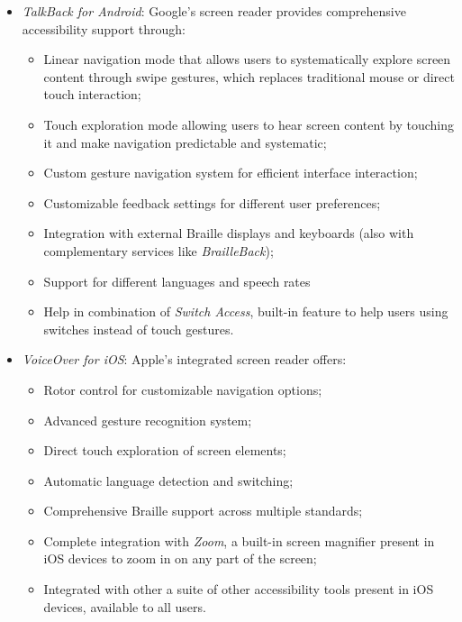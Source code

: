 \begin{itemize}
    \item \textit{TalkBack for Android}: Google's screen reader provides comprehensive accessibility support through:
        \begin{itemize}
            \item Linear navigation mode that allows users to systematically explore screen content through swipe gestures, which replaces traditional mouse or direct touch interaction;
            \item Touch exploration mode allowing users to hear screen content by touching it and make navigation predictable and systematic;
            \item Custom gesture navigation system for efficient interface interaction;
            \item Customizable feedback settings for different user preferences;
            \item Integration with external Braille displays and keyboards (also with complementary services like \textit{BrailleBack});
            \item Support for different languages and speech rates
            \item Help in combination of \textit{Switch Access}, built-in feature to help users using switches instead of touch gestures.
        \end{itemize}
    
    \item \textit{VoiceOver for iOS}: Apple's integrated screen reader offers:
        \begin{itemize}
            \item Rotor control for customizable navigation options;
            \item Advanced gesture recognition system;
            \item Direct touch exploration of screen elements;
            \item Automatic language detection and switching;
            \item Comprehensive Braille support across multiple standards;
            \item Complete integration with \textit{Zoom}, a built-in screen magnifier present in iOS devices to zoom in on any part of the screen;
            \item Integrated with other a suite of other accessibility tools present in iOS devices, available to all users.
        \end{itemize}


\end{itemize}
